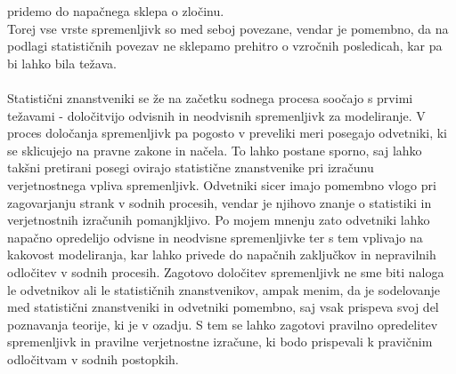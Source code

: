 \documentclass[mat1, tisk]{fmfdelo}
\theoremstyle{definition} %
\theoremstyle{trditev} %
\theoremstyle{izrek}
\begin{document}
pridemo do napačnega sklepa o zločinu.\\
Torej vse vrste spremenljivk so med seboj povezane, vendar je pomembno, da na podlagi statističnih povezav ne sklepamo prehitro o vzročnih posledicah,
kar pa bi lahko bila težava.\\\\
Statistični znanstveniki se že na začetku sodnega procesa soočajo s prvimi težavami - določitvijo odvisnih in neodvisnih spremenljivk za
modeliranje. V proces določanja spremenljivk pa pogosto v preveliki meri posegajo odvetniki, ki se sklicujejo na pravne zakone in načela. To lahko
postane sporno, saj lahko takšni pretirani posegi ovirajo statistične znanstvenike pri izračunu verjetnostnega vpliva spremenljivk. Odvetniki sicer
imajo pomembno vlogo pri zagovarjanju strank v sodnih procesih, vendar je njihovo znanje o statistiki in verjetnostnih izračunih pomanjkljivo. Po
mojem mnenju zato odvetniki lahko napačno opredelijo odvisne in neodvisne spremenljivke ter s tem vplivajo na kakovost modeliranja, kar lahko privede
do napačnih zaključkov in nepravilnih odločitev v sodnih procesih. Zagotovo določitev spremenljivk ne sme biti naloga le odvetnikov ali le statističnih
znanstvenikov, ampak menim, da je sodelovanje med statistični znanstveniki in odvetniki pomembno, saj vsak prispeva svoj del poznavanja teorije,
ki je v ozadju.  S tem se lahko zagotovi pravilno opredelitev spremenljivk in pravilne verjetnostne izračune, ki bodo prispevali k pravičnim
odločitvam v sodnih postopkih.

\end{document}
